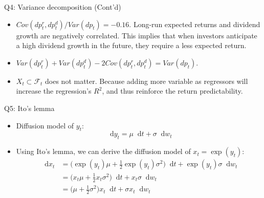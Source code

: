 \documentclass[10pt,t]{beamer}
\newcommand*\diff{\mathop{}\!\mathrm{d}}
\begin{document}
\begin{frame}{Q4: Variance decomposition (Cont'd)}
\begin{itemize}
  \item $Cov(dp_t^r, dp_t^d) / Var(dp_t) = -0.16$. Long-run expected returns and dividend growth are negatively correlated. This implies that when investors anticipate a high dividend growth in the future, they require a less expected return.
  \item $Var(dp_t^r) + Var(dp_t^d) - 2Cov(dp_t^r, dp_t^d) = Var(dp_t)$.
  \item $X_t \subset \mathcal{F}_t$ does not matter. Because adding more variable as regressors will increase the regression's $R^2$, and thus reinforce the return predictability.
\end{itemize}
\end{frame}



\begin{frame}{Q5: Ito's lemma}
\begin{itemize}
  \item Diffusion model of $y_t$:
  $$
  \diff y_t = \mu \diff t + \sigma \diff w_t
  $$
  \item Using Ito's lemma, we can derive the diffusion model of $x_t = \exp(y_t)$:
  \begin{equation*}
  \begin{split}
  \diff x_t & = \big(\exp(y_t) \mu + \frac{1}{2} \exp(y_t) \sigma^2 \big) \diff t + \exp(y_t) \sigma \diff w_t \\
  & = \big(x_t \mu + \frac{1}{2} x_t \sigma^2 \big) \diff t + x_t \sigma \diff w_t \\
  & = \big(\mu + \frac{1}{2}\sigma^2 \big) x_t \diff t + \sigma x_t  \diff w_t
  \end{split}
  \end{equation*}
\end{itemize}
\end{frame}
\end{document}
